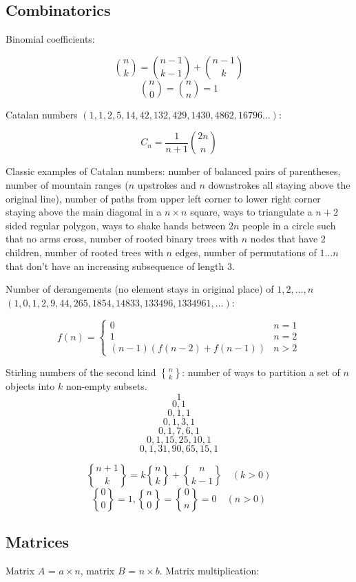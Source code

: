 \documentclass{article}
\DeclareRobustCommand{\stirling}{\genfrac\{\}{0pt}{}} %
\begin{document}
\subsection {Combinatorics}

Binomial coefficients:

\[ \binom{n}{k} = \binom{n-1}{k-1} + \binom{n-1}{k} \]
\[ \binom{n}{0} = \binom{n}{n} = 1 \]

Catalan numbers $(1, 1, 2, 5, 14, 42, 132, 429, 1430, 4862, 16796 \dots)$:

\[ C_n = \frac{1}{n+1} \binom{2n}{n} \]

Classic examples of Catalan numbers: number of balanced pairs of parentheses,  number of mountain ranges ($n$ upstrokes and $n$ downstrokes all staying above the original line), number of paths from upper left corner to lower right corner staying above the main diagonal in a $n \times n$ square, ways to triangulate a $n+2$ sided regular polygon, ways to shake hands between $2n$ people in a circle such that no arms cross, number of rooted binary trees with $n$ nodes that have $2$ children, number of rooted trees with $n$ edges, number of permutations of $1 \dots n$ that don't have an increasing subsequence of length $3$.

Number of derangements (no element stays in original place) of $1, 2, \dots, n$ $(1, 0, 1, 2, 9, 44, 265, 1854, 14833, 133496, 1334961, \dots)$:

\[
	f(n) =
	\begin{cases}
		0 &n = 1 \\
		1 &n = 2 \\
		(n-1)(f(n-2)+f(n-1)) &n > 2
	\end{cases}
\]

Stirling numbers of the second kind $\stirling{n}{k}$: number of ways to partition a set of $n$ objects into $k$ non-empty subsets.
\[ 1 \] \[ 0, 1 \] \[0, 1, 1 \] \[0, 1, 3, 1 \] \[ 0, 1, 7, 6, 1 \] \[ 0, 1, 15, 25, 10, 1 \] \[ 0, 1, 31, 90, 65, 15, 1 \]

\[ \stirling{n+1}{k} = k\stirling{n}{k}+\stirling{n}{k-1} \quad (k > 0) \] 
\[ \stirling{0}{0} = 1, \stirling{n}{0} = \stirling{0}{n} = 0 \quad (n > 0) \]

\subsection {Matrices}

Matrix $A$ = $a \times n$, matrix $B$ = $n \times b$. Matrix multiplication:
\end{document}
